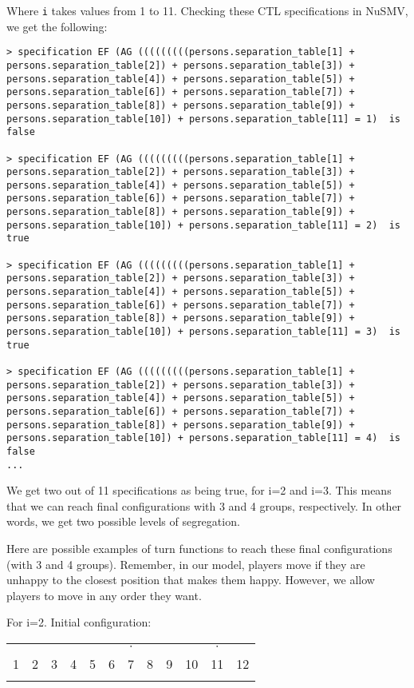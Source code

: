 \documentclass[../main.tex]{subfiles}
\begin{document}
Where \verb|i| takes values from 1 to 11. Checking these CTL specifications in NuSMV, we get the following:
\begin{lstlisting}
> specification EF (AG (((((((((persons.separation_table[1] + persons.separation_table[2]) + persons.separation_table[3]) + persons.separation_table[4]) + persons.separation_table[5]) + persons.separation_table[6]) + persons.separation_table[7]) + persons.separation_table[8]) + persons.separation_table[9]) + persons.separation_table[10]) + persons.separation_table[11] = 1)  is false

> specification EF (AG (((((((((persons.separation_table[1] + persons.separation_table[2]) + persons.separation_table[3]) + persons.separation_table[4]) + persons.separation_table[5]) + persons.separation_table[6]) + persons.separation_table[7]) + persons.separation_table[8]) + persons.separation_table[9]) + persons.separation_table[10]) + persons.separation_table[11] = 2)  is true

> specification EF (AG (((((((((persons.separation_table[1] + persons.separation_table[2]) + persons.separation_table[3]) + persons.separation_table[4]) + persons.separation_table[5]) + persons.separation_table[6]) + persons.separation_table[7]) + persons.separation_table[8]) + persons.separation_table[9]) + persons.separation_table[10]) + persons.separation_table[11] = 3)  is true

> specification EF (AG (((((((((persons.separation_table[1] + persons.separation_table[2]) + persons.separation_table[3]) + persons.separation_table[4]) + persons.separation_table[5]) + persons.separation_table[6]) + persons.separation_table[7]) + persons.separation_table[8]) + persons.separation_table[9]) + persons.separation_table[10]) + persons.separation_table[11] = 4)  is false
...
\end{lstlisting}

We get two out of 11 specifications as being true, for i=2 and i=3. This means that we can reach final configurations with 3 and 4 groups, respectively. In other words, we get two possible levels of segregation.

Here are possible examples of turn functions to reach these final configurations (with 3 and 4 groups). Remember, in our model, players move if they are unhappy to the closest position that makes them happy. However, we allow players to move in any order they want.

For i=2. Initial configuration:
 \begin{table}[H]
\begin{center}
{\begin{tabular}{| c |c| c| c| c |c| c |c|c|c|c|c| }
\hline
 &  &  & & & & $\cdot$ & &  & &$\cdot$ &\\
1 & 2 &3 &4 & 5 &6  &7 &8 & 9& 10&11&12\\
\x&\x & \x &\z &\z &\z & \x &\z  &\x &\z &\x&\z \\
 \hline
\end{tabular}}
\end{center}
\end{table}
\end{document}

